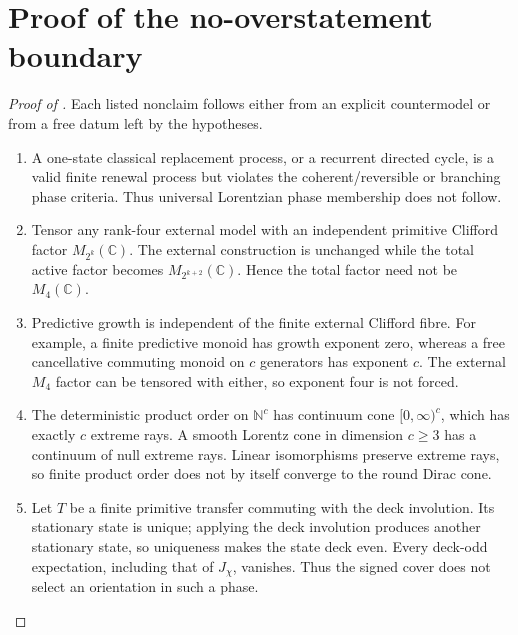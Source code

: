 \documentclass[11pt]{article}
\theoremstyle{definition}
\theoremstyle{remark}
\newcommand{\N}{\mathbb N}
\newcommand{\C}{\mathbb C}
\begin{document}
\section{Proof of the no-overstatement boundary}
\label{app:proof-nonclaims}

\begin{proof}[Proof of ]
Each listed nonclaim follows either from an explicit countermodel or from a
free datum left by the hypotheses.

\begin{enumerate}[label=\textup{(\arabic*)},leftmargin=2.7em]
\item A one-state classical replacement process, or a recurrent directed cycle,
is a valid finite renewal process but violates the coherent/reversible or
branching phase criteria.  Thus universal Lorentzian phase membership does not
follow.

\item Tensor any rank-four external model with an independent primitive
Clifford factor $M_{2^k}(\C)$.  The external construction is unchanged while the
total active factor becomes $M_{2^{k+2}}(\C)$.  Hence the total factor need not
be $M_4(\C)$.

\item Predictive growth is independent of the finite external Clifford fibre.
For example, a finite predictive monoid has growth exponent zero, whereas a
free cancellative commuting monoid on $c$ generators has exponent $c$.  The
external $M_4$ factor can be tensored with either, so exponent four is not
forced.

\item The deterministic product order on $\N^c$ has continuum cone
$[0,\infty)^c$, which has exactly $c$ extreme rays.  A smooth Lorentz cone in
dimension $c\ge3$ has a continuum of null extreme rays.  Linear isomorphisms
preserve extreme rays, so finite product order does not by itself converge to
the round Dirac cone.

\item Let $T$ be a finite primitive transfer commuting with the deck
involution.  Its stationary state is unique; applying the deck involution
produces another stationary state, so uniqueness makes the state deck even.
Every deck-odd expectation, including that of $J_\chi$, vanishes.  Thus the
signed cover does not select an orientation in such a phase.


\end{enumerate}
\end{proof}
\end{document}
